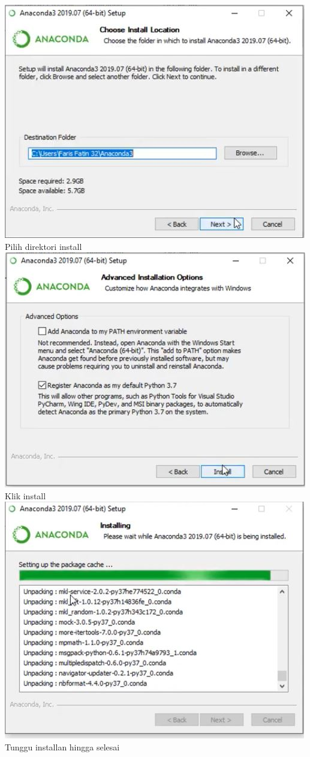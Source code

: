 \begin{enumerate}
\includegraphics{gambar/1_3.jpg}
Pilih direktori install\\

\includegraphics{gambar/1_4.jpg}
Klik install\\

\includegraphics{gambar/1_5.jpg}
Tunggu installan hingga selesai\\


\end{enumerate}
